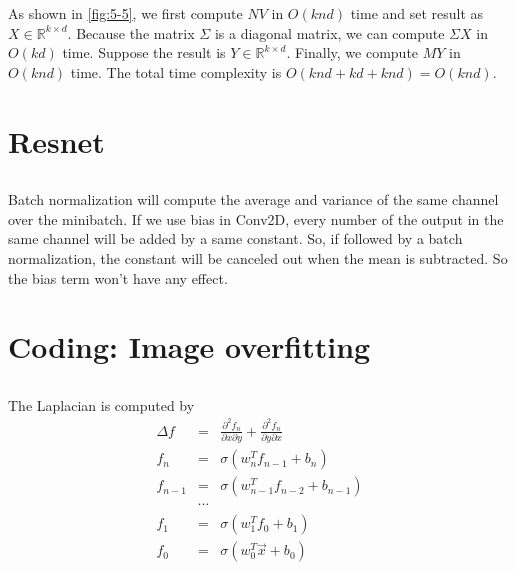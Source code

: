 \documentclass[12pt]{article}
\begin{document}
As shown in \ref*{fig:5-5}, we first compute $N V$ in $O(knd)$ time and set result as $X \in \mathbb{R}^{k\times d}$. Because the matrix $\varSigma$ is a diagonal matrix, we can compute $\varSigma X$ in $O(kd)$ time. Suppose the result is $Y \in \mathbb{R}^{k\times d}$. 
Finally, we compute $M Y$ in $O(knd)$ time. The total time complexity is $O(knd + kd + knd) = O(knd)$.
\section{Resnet}
\setcounter{subsection}{1}
\subsection{}
Batch normalization will compute the average and variance of the same channel over the minibatch.
If we use bias in Conv2D, every number of the output in the same channel will be added by a same constant. So, if followed by a batch normalization, the constant will be canceled out when the mean is subtracted. So the bias term won't have any effect.

\newpage

\section{Coding: Image overfitting}
\setcounter{subsection}{4}
\subsection{}

\subsection{}
The Laplacian is computed by 
\begin{eqnarray}
    \Delta f &=& \frac{\partial^2 f_n}{\partial x \partial y} + \frac{\partial^2 f_n}{\partial y \partial x} \nonumber \\
    f_n &=& \sigma(w_n^T f_{n-1} + b_n) \nonumber \\
    f_{n-1} &=& \sigma(w_{n-1}^T f_{n-2} + b_{n-1}) \nonumber \\
    &\cdots& \nonumber \\
    f_1 &=& \sigma(w_1^T f_0 + b_1) \nonumber \\
    f_0 &=& \sigma(w_0^T \vec{x} + b_0) \nonumber 
\end{eqnarray}
\end{document}
